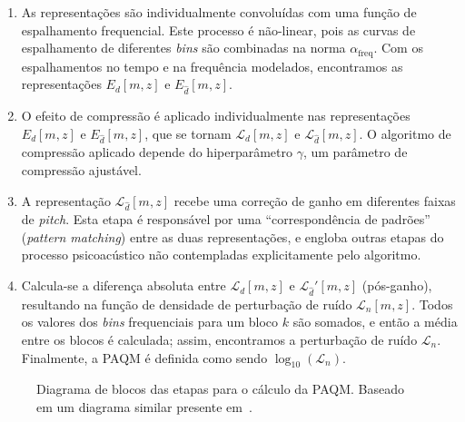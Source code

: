 \begin{enumerate}
	\item As representações são individualmente convoluídas com uma função de espalhamento
	      frequencial. Este processo é não-linear, pois as curvas de espalhamento de diferentes
	      \textit{bins} são combinadas na norma $\alpha_{\text{freq}}$. Com os espalhamentos no
	      tempo e na frequência modelados, encontramos as representações $E_d[m, z]$ e
	      $E_{\hat{d}}[m, z]$.

	\item O efeito de compressão é aplicado individualmente nas representações $E_d[m, z]$ e
	      $E_{\hat{d}}[m, z]$, que se tornam $\mathcal{L}_d[m, z]$ e $\mathcal{L}_{\hat{d}}[m,
		      z]$. O algoritmo de compressão aplicado depende do hiperparâmetro $\gamma$, um
	      parâmetro de compressão ajustável.

	\item A representação $\mathcal{L}_{\hat{d}}[m, z]$ recebe uma correção de ganho em
	      diferentes faixas de \textit{pitch}. Esta etapa é responsável por uma ``correspondência
	      de padrões'' (\textit{pattern matching}) entre as duas representações, e engloba outras
	      etapas do processo psicoacústico não contempladas explicitamente pelo algoritmo.

	\item Calcula-se a diferença absoluta entre $\mathcal{L}_d[m, z]$ e
	      $\mathcal{L}_{\hat{d}}'[m, z]$ (pós-ganho), resultando na função de densidade de
	      perturbação de ruído $\mathcal{L}_n[m, z]$. Todos os valores dos \textit{bins}
	      frequenciais para um bloco $k$ são somados, e então a média entre os blocos é
	      calculada; assim, encontramos a perturbação de ruído
	      $\mathcal{L}_n$.
	      Finalmente, a PAQM é definida como sendo $\log_{10}(\mathcal{L}_n)$.
\end{enumerate}

\begin{figure}[hbtp]
	\centering
	
	\caption[Diagrama de blocos da PAQM]{Diagrama de blocos das etapas para o cálculo da PAQM. Baseado em um diagrama similar presente em~\cite{beerends-2002}.}
	\label{fig:metricas:paqm-diagram}
\end{figure}

